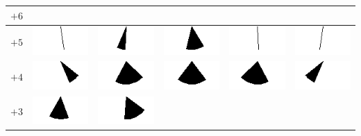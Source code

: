 \begin{tabular}{|c|c|c|c|c|c|}
	\hline 
	$+6$ & &&&&\\
	\hline 
	$+5$ &
	\includegraphics[width=0.045\linewidth]{img_Bereich/V1_img_Winkel_X_-2000_5000.png} &
	\includegraphics[width=0.045\linewidth]{img_Bereich/V1_img_Winkel_X_-1000_5000.png} &
	\includegraphics[width=0.045\linewidth]{img_Bereich/V1_img_Winkel_X_0_5000.png} &
	\includegraphics[width=0.045\linewidth]{img_Bereich/V1_img_Winkel_X_1000_5000.png} &
	\includegraphics[width=0.045\linewidth]{img_Bereich/V1_img_Winkel_X_2000_5000.png} \\ 
	\hline 
	$+4$ &
	\includegraphics[width=0.045\linewidth]{img_Bereich/V1_img_Winkel_X_-2000_4000.png} &
	\includegraphics[width=0.045\linewidth]{img_Bereich/V1_img_Winkel_X_-1000_4000.png} &
	\includegraphics[width=0.045\linewidth]{img_Bereich/V1_img_Winkel_X_0_4000.png} &
	\includegraphics[width=0.045\linewidth]{img_Bereich/V1_img_Winkel_X_1000_4000.png} &
	\includegraphics[width=0.045\linewidth]{img_Bereich/V1_img_Winkel_X_2000_4000.png} \\ 
	\hline 
	$+3$ &
	\includegraphics[width=0.045\linewidth]{img_Bereich/V1_img_Winkel_X_-2000_3000.png} &
	\includegraphics[width=0.045\linewidth]{img_Bereich/V1_img_Winkel_X_-1000_3000.png} &

\end{tabular}
